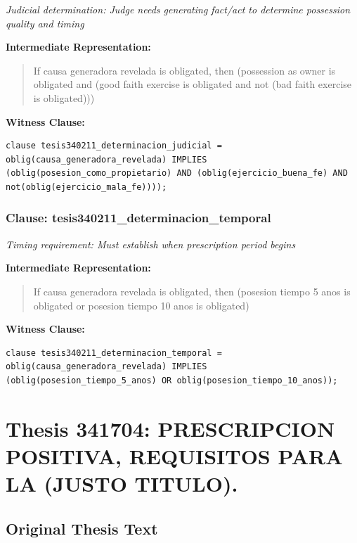 \documentclass[11pt,a4paper]{article}
\begin{document}
\textit{Judicial determination: Judge needs generating fact/act to determine possession quality and timing}

\textbf{Intermediate Representation:}

\begin{quote}
If causa generadora revelada is obligated, then (possession as owner is obligated and (good faith exercise is obligated and not (bad faith exercise is obligated)))
\end{quote}

\textbf{Witness Clause:}

\begin{lstlisting}[style=witnessstyle, language=Witness]
clause tesis340211_determinacion_judicial = oblig(causa_generadora_revelada) IMPLIES (oblig(posesion_como_propietario) AND (oblig(ejercicio_buena_fe) AND not(oblig(ejercicio_mala_fe))));
\end{lstlisting}

\subsubsection{Clause: tesis340211\_determinacion\_temporal}

\textit{Timing requirement: Must establish when prescription period begins}

\textbf{Intermediate Representation:}

\begin{quote}
If causa generadora revelada is obligated, then (posesion tiempo 5 anos is obligated or posesion tiempo 10 anos is obligated)
\end{quote}

\textbf{Witness Clause:}

\begin{lstlisting}[style=witnessstyle, language=Witness]
clause tesis340211_determinacion_temporal = oblig(causa_generadora_revelada) IMPLIES (oblig(posesion_tiempo_5_anos) OR oblig(posesion_tiempo_10_anos));
\end{lstlisting}

\newpage

\section{Thesis 341704: PRESCRIPCION POSITIVA, REQUISITOS PARA LA (JUSTO TITULO).}
\label{thesis:341704}

\subsection{Original Thesis Text}
\end{document}
